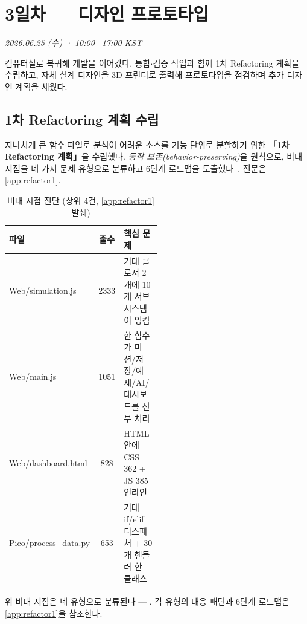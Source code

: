 \chapter{3일차 — 디자인 프로토타입}
\textit{2026.06.25 (수) · 10:00\,--\,17:00 KST}

\begin{summarybox}
컴퓨터실로 복귀해 개발을 이어갔다. 통합$\cdot$검증 작업과 함께 1차 Refactoring
계획을 수립하고, 자체 설계 디자인을 3D 프린터로 출력해 프로토타입을 점검하며
추가 디자인 계획을 세웠다.
\end{summarybox}

\section{1차 Refactoring 계획 수립}
지나치게 큰 함수$\cdot$파일로 분석이 어려운 소스를 기능 단위로 분할하기 위한
\textbf{「1차 Refactoring 계획」}을 수립했다. \emph{동작 보존(behavior-preserving)}을
원칙으로, 비대 지점을 네 가지 문제 유형으로 분류하고 6단계 로드맵을
도출했다~\cite{fowler2018refactoring, martin2008cleancode}. 전문은 \ref{app:refactor1}.

\begin{table}[htbp]\centering\small
\caption{비대 지점 진단 (상위 4건, \ref{app:refactor1} 발췌)}
\renewcommand{\arraystretch}{1.2}
\begin{tabularx}{\linewidth}{@{}>{\ttfamily\footnotesize}l c L{0.5\linewidth}@{}}
\toprule
\sffamily 파일 & \sffamily 줄수 & \sffamily 핵심 문제 \\
\midrule
Web/simulation.js     & 2333 & 거대 클로저 2개에 10개 서브시스템이 엉킴 \\
Web/main.js           & 1051 & 한 함수가 미션/저장/예제/AI/대시보드를 전부 처리 \\
Web/dashboard.html    & 828  & HTML 안에 CSS 362 + JS 385 인라인 \\
Pico/process\_data.py & 653  & 거대 if/elif 디스패처 + 30개 핸들러 한 클래스 \\
\bottomrule
\end{tabularx}
\end{table}

\noindent 위 비대 지점은 네 유형으로 분류된다 ---
   .
각 유형의 대응 패턴과 6단계 로드맵은 \ref{app:refactor1}을 참조한다.

